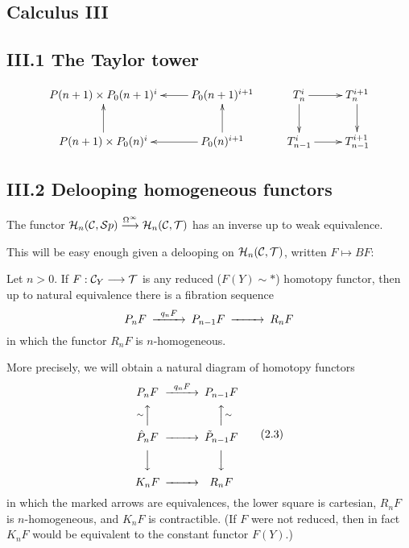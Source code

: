 \documentclass[11pt]{article}
\begin{document}
\begin{Calculus III}
\section*{Calculus III}
\subsection*{III.1 The Taylor tower}
\[\xymatrix{
P(n+1)\times P_0(n+1)^i
&%
P_0(n+1)^{i+1}
\ar[l]
&%
T_n^i
\ar[r]
\ar[d]_{}="1"
&%
T_n^{i+1}
\ar[d]
\\%
P(n+1)\times P_0(n)^i
\ar[u]
&%
P_0(n)^{i+1}
\ar[l]
\ar[u]_{}="2"
&%
T^i_{n-1}
\ar[r]
&%
T^{i+1}_{n-1}
}\]
\subsection*{III.2 Delooping homogeneous functors}
\begin{thm*}[\textbf{2.1}]
The functor
$
\mathcal{H}_n(\mathcal{C},\mathcal{S} p)\overset{\Omega^\infty}{\longrightarrow}\mathcal{H}_n(\mathcal{C},\mathcal{T})
$
has an inverse up to weak equivalence.
\end{thm*}
This will be easy enough given a delooping on $\mathcal{H}_n(\mathcal{C},\mathcal{T})$, written $F\mapsto BF$:
\begin{lem*}[\textbf{2.2}]
Let $n>0$. If $F:\mathcal{C}_Y\longrightarrow\mathcal{T}$ is
any reduced ($F(Y)\sim *$) homotopy functor, then up to natural equivalence
there is a fibration sequence
$$\CD
                            P_nF @>{q_nF}>> P_{n-1}F @>>> R_nF
\endCD
$$
in which the functor $R_nF$ is $n$-homogeneous.
\end{lem*}




More precisely, we will obtain a
natural  diagram of homotopy functors
\[
\CD
P_nF @>{q_nF}>> P_{n-1}F\\
@A{\sim}AA @AA{\sim}A\\
\hat P_nF @>>> \tilde P_{n-1}F\\
@VVV @VVV\\
K_nF @>>> R_nF
\endCD\tag{2.3}
\]
in which the marked arrows are equivalences, the lower square
is cartesian,
$R_nF$ is
$n$-homogeneous, and $K_nF$ is contractible. (If $F$ were not reduced,
then in fact $K_nF$ would be equivalent to the constant functor
$F(Y)$.)


\end{Calculus III}
\end{document}
